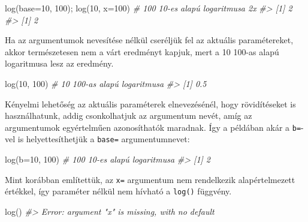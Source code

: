 \documentclass[
]{book}
\newenvironment{Shaded}{\begin{snugshade}}{\end{snugshade}}
\newcommand{\AttributeTok}[1]{\textcolor[rgb]{0.77,0.63,0.00}{#1}}
\newcommand{\CommentTok}[1]{\textcolor[rgb]{0.56,0.35,0.01}{\textit{#1}}}
\newcommand{\DecValTok}[1]{\textcolor[rgb]{0.00,0.00,0.81}{#1}}
\newcommand{\FunctionTok}[1]{\textcolor[rgb]{0.00,0.00,0.00}{#1}}
\newcommand{\NormalTok}[1]{#1}
\begin{document}
\begin{Shaded}
\begin{Highlighting}[]
\FunctionTok{log}\NormalTok{(}\AttributeTok{base=}\DecValTok{10}\NormalTok{, }\DecValTok{100}\NormalTok{); }\FunctionTok{log}\NormalTok{(}\DecValTok{10}\NormalTok{, }\AttributeTok{x=}\DecValTok{100}\NormalTok{)  }\CommentTok{\# 100 10{-}es alapú logaritmusa 2x}
\CommentTok{\#\textgreater{} [1] 2}
\CommentTok{\#\textgreater{} [1] 2}
\end{Highlighting}
\end{Shaded}

Ha az argumentumok nevesítése nélkül cseréljük fel az aktuális paramétereket, akkor természetesen nem a várt eredményt kapjuk, mert a 10 100-as alapú logaritmusa lesz az eredmény.

\begin{Shaded}
\begin{Highlighting}[]
\FunctionTok{log}\NormalTok{(}\DecValTok{10}\NormalTok{, }\DecValTok{100}\NormalTok{)  }\CommentTok{\# 10 100{-}as alapú logaritmusa}
\CommentTok{\#\textgreater{} [1] 0.5}
\end{Highlighting}
\end{Shaded}

Kényelmi lehetőség az aktuális paraméterek elnevezésénél, hogy rövidítéseket is használhatunk, addig csonkolhatjuk az argumentum nevét, amíg az argumentumok egyértelműen azonosíthatók maradnak. Így a példában akár a \texttt{b=}-vel is helyettesíthetjük a \texttt{base=} argumentumnevet:

\begin{Shaded}
\begin{Highlighting}[]
\FunctionTok{log}\NormalTok{(}\AttributeTok{b=}\DecValTok{10}\NormalTok{, }\DecValTok{100}\NormalTok{)   }\CommentTok{\# 100 10{-}es alapú logaritmusa}
\CommentTok{\#\textgreater{} [1] 2}
\end{Highlighting}
\end{Shaded}

Mint korábban említettük, az \texttt{x=} argumentum nem rendelkezik alapértelmezett értékkel, így paraméter nélkül nem hívható a \texttt{log()} függvény.

\begin{Shaded}
\begin{Highlighting}[]
\FunctionTok{log}\NormalTok{()}
\CommentTok{\#\textgreater{} Error: argument "x" is missing, with no default}
\end{Highlighting}
\end{Shaded}
\end{document}
